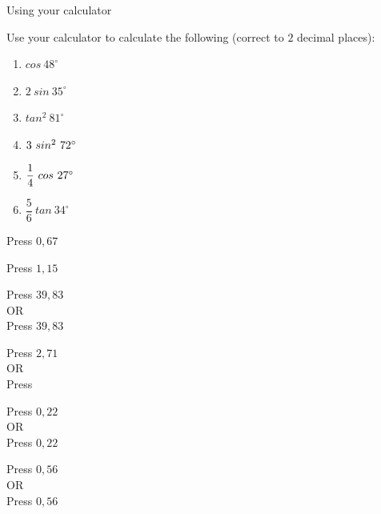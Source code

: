\begin{wex}{Using your calculator}

 {Use your calculator to calculate the following (correct to $2$ decimal places):
\begin{enumerate}[noitemsep, label=\textbf{\arabic*}. ] 
 \item $cos~48^{\circ}$
\item $2~sin~35^{\circ}$
\item $tan^{2}~81^{\circ}$
\item $3~sin^{2}~72^{\circ} \vspace{3pt}$
\item $\dfrac{1}{4}~cos~27^{\circ} \vspace{3pt}$
\item $\dfrac{5}{6}~tan~34^{\circ}$
\end{enumerate}

}
{

\westep{}
Press   \fbox{\LARGE =} $0,67$

\westep{}
Press    \fbox{\LARGE =} $1,15$

\westep{}
Press \fbox{(}   \fbox{)}   \fbox{\LARGE =} $39,83$
\\
OR\\
Press   \fbox{\LARGE =}   \fbox{\LARGE =} $39,83$

\westep{}
Press  \fbox{(}   \fbox{)}  \fbox{\LARGE =} $2,71$
\\
OR\\
Press   \fbox{\LARGE =}   \fbox{\LARGE =} \fbox{$\times$} 

\westep{}
Press \fbox{(}  \fbox{$\div$}  \fbox{)}   \fbox{\LARGE =} $0,22$
\\
OR\\
Press   \fbox{\LARGE =}  \fbox{$\div$}  \fbox{\LARGE =} $0,22$

\westep{}
Press \fbox{(}  \fbox{$\div$}  \fbox{)}   \fbox{\LARGE =} $0,56$
\\
OR\\
Press   \fbox{\LARGE =}  \fbox{$\times$}  \fbox{$\div$}  \fbox{\LARGE =} $0,56$

}
\end{wex}

